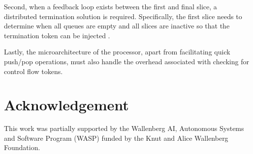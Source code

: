 \documentclass{acaces}
\begin{document}
Second, when a feedback loop exists between the first and final slice, a distributed termination solution is required.
Specifically, the first slice needs to determine when all queues are empty and all slices are inactive so that the termination token can be injected \cite{Dijkstra1983}.

Lastly, the microarchitecture of the processor, apart from facilitating quick push/pop operations, must also handle the overhead associated with checking for control flow tokens.

\section{Acknowledgement}

This work was partially supported by the Wallenberg AI, Autonomous Systems and Software Program (WASP)
funded by the Knut and Alice Wallenberg Foundation.


\end{document}
